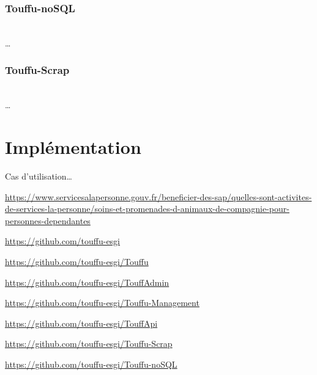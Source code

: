 \documentclass[conference]{IEEEtran}
\begin{document}
\subsubsection*{Touffu-noSQL}
\hfil\\
…\\

\subsubsection*{Touffu-Scrap}
\hfil\\
…\\

\section{Implémentation}

{Cas d'utilisation…}


\begin{thebibliography}{00}

\url{https://www.servicesalapersonne.gouv.fr/beneficier-des-sap/quelles-sont-activites-de-services-la-personne/soins-et-promenades-d-animaux-de-compagnie-pour-personnes-dependantes}

\url{https://github.com/touffu-esgi}

\url{https://github.com/touffu-esgi/Touffu}

\url{https://github.com/touffu-esgi/TouffAdmin}

\url{https://github.com/touffu-esgi/Touffu-Management}

\url{https://github.com/touffu-esgi/TouffApi}

\url{https://github.com/touffu-esgi/Touffu-Scrap}

\url{https://github.com/touffu-esgi/Touffu-noSQL}

\end{thebibliography}
\end{document}
